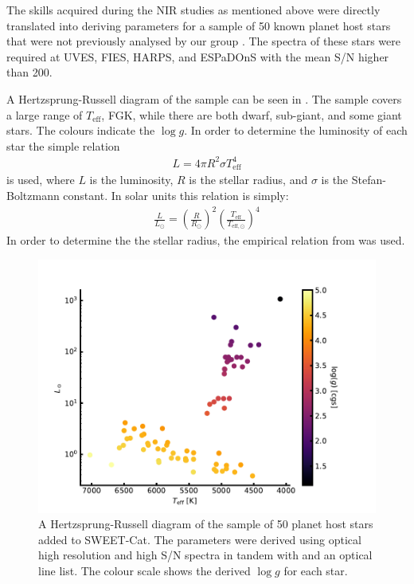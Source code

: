 The skills acquired during the NIR studies as mentioned above were directly translated into deriving
parameters for a sample of 50 known planet host stars that were not previously analysed by our group
\citep{Andreasen2017a}. The spectra of these stars were required at UVES, FIES, HARPS, and ESPaDOnS
with the mean S/N higher than 200.

A Hertzsprung-Russell diagram of the sample can be seen in . The sample covers a
large range of $T_\mathrm{eff}$, FGK, while there are both dwarf, sub-giant, and some giant stars.
The colours indicate the $\log g$. In order to determine the luminosity of each star the simple
relation
\begin{align*}
  L = 4\pi R^2 \sigma T^4_\mathrm{eff}
\end{align*}
is used, where $L$ is the luminosity, $R$ is the stellar radius, and $\sigma$ is the
Stefan-Boltzmann constant. In solar units this relation is simply:
\begin{align*}
  \frac{L}{L_\odot} = \left(\frac{R}{R_\odot}\right)^2 \left(\frac{T_\mathrm{eff}}{T_{\mathrm{eff},\odot}}\right)^4
\end{align*}
In order to determine the the stellar radius, the empirical relation from \citet{Torres2010} was
used.

\begin{figure}[htpb!]
    \centering
    \includegraphics[width=1.0\linewidth]{figures/HR.pdf}
    \caption{A Hertzsprung-Russell diagram of the sample of 50 planet host stars added to SWEET-Cat.
             The parameters were derived using optical high resolution and high S/N spectra in
             tandem with  and an optical line list. The colour scale shows the derived
             $\log g$ for each star.}
    \label{fig:sweetcat}
\end{figure}

